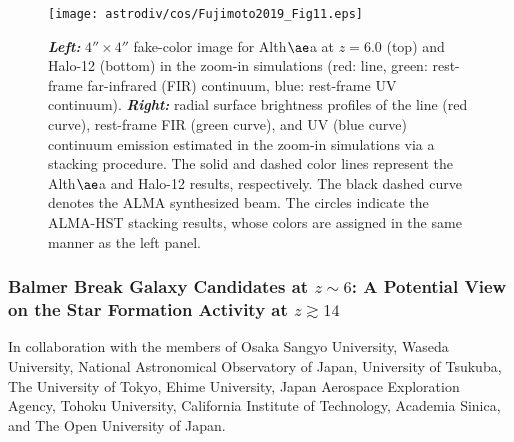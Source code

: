 \begin{figure}
\begin{center}
\texttt{[image: astrodiv/cos/Fujimoto2019\_Fig11.eps]} 
\end{center}
\vspace{-5mm}
\caption{
{\it \bf Left:} 
$4''\times4''$ fake-color image for Alth$\ae$a at $z=6.0$ (top) and Halo-12 (bottom) in the zoom-in simulations 
(red: {\sc [Cii]} line, green: rest-frame 
far-infrared (FIR)  
continuum, blue: rest-frame UV continuum). 
{\it \bf Right:} 
radial surface brightness profiles of the {\sc [Cii]} line (red curve), rest-frame FIR (green curve), and UV (blue curve) continuum emission estimated in the zoom-in simulations via a stacking procedure. 
The solid and dashed color lines represent the Alth$\ae$a and Halo-12 results, respectively.  
The black dashed curve denotes the ALMA synthesized beam. 
The circles indicate the ALMA-HST stacking results, whose colors are assigned in the same manner as the left panel.  
}
\label{cos:fujimoto2019_fig11}
\end{figure}







\subsubsection*{\bi
Balmer Break Galaxy Candidates at $z\sim6$: 
A Potential View on the Star Formation Activity at $z \gtrsim 14$ 
{\rm \cite{mawatari2020}}
}

\vspace{3pt}

\noindent
In collaboration with the members of
\noindent
Osaka Sangyo University, 
Waseda University, 
National Astronomical Observatory of Japan, 
University of Tsukuba, 
The University of Tokyo, 
Ehime University, 
Japan Aerospace Exploration Agency, 
Tohoku University, 
California Institute of Technology, 
Academia Sinica, 
and 
The Open University of Japan. 

\vspace{10pt}


